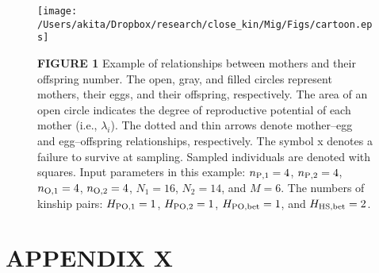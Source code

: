 \documentclass[12pt, English]{article}
\begin{document}
\begin{spacing}{1.9}
\clearpage

\newcommand{\figcapa}{Example of relationships between mothers and their offspring number. The open, gray, and filled circles represent mothers, their eggs, and their offspring, respectively. The area of an open circle indicates the degree of reproductive potential of each mother (i.e., $\lambda_i$). The dotted and thin arrows denote mother--egg and egg--offspring relationships, respectively. The symbol x denotes a failure to survive at sampling. Sampled individuals are denoted with squares. Input parameters in this example: $n_{\rm P, 1}=4$, $n_{\rm P, 2}=4$, $n_{\rm O, 1}=4$, $n_{\rm O, 2}=4$, $N_{1}=16$, $N_{2}=14$, and $M=6$. The numbers of kinship pairs: $H_{\rm PO, 1}=1$, $H_{\rm PO, 2}=1$, $H_{\rm PO, bet}=1$, and $H_{\rm HS, bet}=2$.}

\newcommand{\figcapb}{Violin plots showing the distribution of relative bias in our estimator (Eq.~\ref{NeN_hat2}) for various values of $c$ and sample size. Filled circles represent the mean values. Sample sizes for mothers and offspring are identical (i.e., $n=n_{\rm M} = n_{\rm O}$) and indicated in the legend. For the demonstration purposes, the distribution is truncated, although the mean values are calculated including the truncated values. (a) $N_{\rm m}=1{,}000$, (b) $N_{\rm m}=10{,}000$.}

\newcommand{\figcapsg}{Violin plots showing the distribution of relative bias of $N_{\rm e}/N$ (denoted in Eq.~\ref{NeN_wang}) for various sample sizes. Filled circles represent the mean values. The sample numbers of parents and offspring are identical (i.e., $n=n_{\rm P} = n_{\rm O}$) and indicated in the legend. For demonstration purposes, the distribution is truncated, although the mean values are calculated including the truncated values. (a) $N=2{,}000$, (b) $N=20{,}000$.}

\begin{figure}[!h]
	\begin{center}
		\texttt{[image: /Users/akita/Dropbox/research/close\_kin/Mig/Figs/cartoon.eps]}
		\caption{{\bf FIGURE 1} \figcapa{}}
		\label{cartoon}
	\end{center}
\end{figure}


\clearpage

\section*{APPENDIX X}
\setcounter{equation}{0}



\end{spacing}
\end{document}
